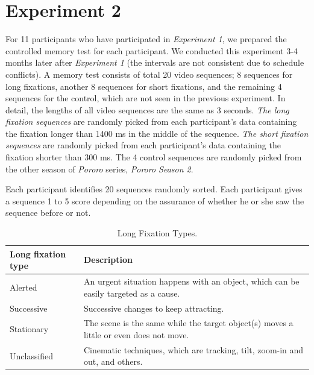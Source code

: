 \documentclass[oneside,master]{snueethesis}
\begin{document}
\section{Experiment 2}

For 11 participants who have participated in \textit{Experiment 1}, we prepared the controlled memory test for each participant. We conducted this experiment 3-4 months later after \textit{Experiment 1} (the intervals are not consistent due to schedule conflicts). A memory test consists of total 20 video sequences; 8 sequences for long fixations, another 8 sequences for short fixations, and the remaining 4 sequences for the control, which are not seen in the previous experiment. In detail, the lengths of all video sequences are the same as 3 seconds. \textit{The long fixation sequences} are randomly picked from each participant's data containing the fixation longer than 1400 ms in the middle of the sequence. \textit{The short fixation sequences} are randomly picked from each participant's data containing the fixation shorter than 300 ms. The 4 control sequences are randomly picked from the other season of \textit{Pororo} series, \textit{Pororo Season 2}.

Each participant identifies 20 sequences randomly sorted. Each participant gives a sequence 1 to 5 score depending on the assurance of whether he or she saw the sequence before or not. 

\begin{table}[!ht]
\begin{center} 
\caption{Long Fixation Types.} 
\label{tab:long-fixation-types} 
\vskip 0.12in
\begin{tabular}{ll} 
\hline
Long fixation type    &  Description \\
\hline
Alerted         &   An urgent situation happens with an object, 
                      which can be easily targeted as a cause. \\
Successive      &   Successive changes to keep attracting. \\
Stationary      &   The scene is the same while the target object(s)
                      moves a little or even does not move. \\
Unclassified    &   Cinematic techniques, which are tracking, tilt, 
                      zoom-in and out, and others. \\
\hline
\end{tabular} 
\end{center} 
\end{table}
\end{document}
